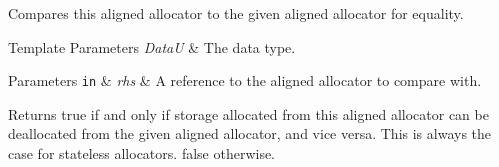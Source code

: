 Compares this aligned allocator to the given aligned allocator for equality.


\begin{DoxyTemplParams}{Template Parameters}
{\em DataU} & The data type. \\
\hline
\end{DoxyTemplParams}

\begin{DoxyParams}[1]{Parameters}
\mbox{\tt in}  & {\em rhs} & A reference to the aligned allocator to compare with. \\
\hline
\end{DoxyParams}
\begin{DoxyReturn}{Returns}
{\ttfamily true} if and only if storage allocated from this aligned allocator can be deallocated from the given aligned allocator, and vice versa. This is always the case for stateless allocators. {\ttfamily false} otherwise. 
\end{DoxyReturn}
